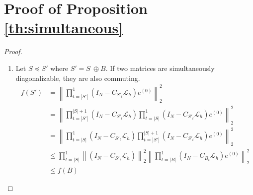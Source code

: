 \documentclass[12pt]{article}
\begin{document}
\section{Proof of Proposition \ref{th:simultaneous}}

\begin{proof}

\begin{enumerate}
    \item[(i)] Let $S \preceq S'$ where $S' = S \ \oplus B$. If two matrices are simultaneously diagonalizable, they are also commuting.
\begin{align*}
    f(S') &= \left \|\prod_{t = |S'|}^1\left(I_N - C_{S'_t}\mathcal{L}_h\right) e^{(0)}\right\|^2_2 \\
    &= \left \|\prod_{t = |S'|}^{|S| + 1}\left(I_N - C_{S'_t}\mathcal{L}_h\right)\prod_{t = |S|}^1\left(I_N - C_{S'_t}\mathcal{L}_h\right) e^{(0)}\right\|^2_2 \\
    &= \left \|\prod_{t = |S|}^1\left(I_N - C_{S'_t}\mathcal{L}_h\right)\prod_{t = |S'|}^{|S| + 1}\left(I_N - C_{S'_t}\mathcal{L}_h\right) e^{(0)}\right\|^2_2 \\
    &\leq  \prod_{t = |S|}^1  \left\|\left(I_N - C_{S'_t}\mathcal{L}_h\right) \right\|^2_2 \left\|\prod_{t = |B|}^{1}\left(I_N - C_{B_t}\mathcal{L}_h\right) e^{(0)}\right\|^2_2 \\
    &\leq f(B)
\end{align*}


\end{enumerate}
\end{proof}
\end{document}
